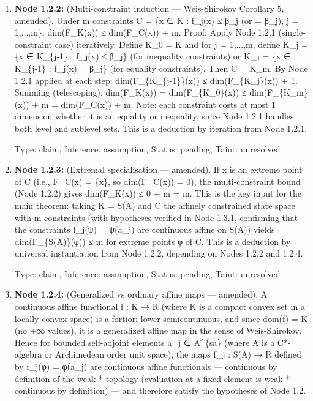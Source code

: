 \documentclass{article}
\begin{document}
\begin{enumerate}
\begin{enumerate}
  Type: claim, Inference: assumption, Status: pending, Taint: unresolved

\item \textbf{Node 1.2.2:} (Multi-constraint induction — Weis-Shirokov Corollary 5, amended). Under m constraints C = \{x ∈ K : f\_j(x) ≤ β\_j (or = β\_j), j = 1,...,m\}: dim(F\_K(x)) ≤ dim(F\_C(x)) + m. Proof: Apply Node 1.2.1 (single-constraint case) iteratively. Define K\_0 = K and for j = 1,...,m, define K\_j = \{x ∈ K\_\{j-1\} : f\_j(x) ≤ β\_j\} (for inequality constraints) or K\_j = \{x ∈ K\_\{j-1\} : f\_j(x) = β\_j\} (for equality constraints). Then C = K\_m. By Node 1.2.1 applied at each step: dim(F\_\{K\_\{j-1\}\}(x)) ≤ dim(F\_\{K\_j\}(x)) + 1. Summing (telescoping): dim(F\_K(x)) = dim(F\_\{K\_0\}(x)) ≤ dim(F\_\{K\_m\}(x)) + m = dim(F\_C(x)) + m. Note: each constraint costs at most 1 dimension whether it is an equality or inequality, since Node 1.2.1 handles both level and sublevel sets. This is a deduction by iteration from Node 1.2.1.

  Type: claim, Inference: assumption, Status: pending, Taint: unresolved

\item \textbf{Node 1.2.3:} (Extremal specialisation — amended). If x is an extreme point of C (i.e., F\_C(x) = \{x\}, so dim(F\_C(x)) = 0), the multi-constraint bound (Node 1.2.2) gives dim(F\_K(x)) ≤ 0 + m = m. This is the key input for the main theorem: taking K = S(A) and C the affinely constrained state space with m constraints (with hypotheses verified in Node 1.3.1, confirming that the constraints f\_j(ψ) = ψ(a\_j) are continuous affine on S(A)) yields dim(F\_\{S(A)\}(φ)) ≤ m for extreme points φ of C. This is a deduction by universal instantiation from Node 1.2.2, depending on Nodes 1.2.2 and 1.2.4.

  Type: claim, Inference: assumption, Status: pending, Taint: unresolved

\item \textbf{Node 1.2.4:} (Generalized vs ordinary affine maps — amended). A continuous affine functional f : K → R (where K is a compact convex set in a locally convex space) is a fortiori lower semicontinuous, and since dom(f) = K (no +∞ values), it is a generalized affine map in the sense of Weis-Shirokov. Hence for bounded self-adjoint elements a\_j ∈ A\textasciicircum{}\{sa\} (where A is a C*-algebra or Archimedean order unit space), the maps f\_j : S(A) → R defined by f\_j(φ) = φ(a\_j) are continuous affine functionals — continuous by definition of the weak-* topology (evaluation at a fixed element is weak-* continuous by definition) — and therefore satisfy the hypotheses of Node 1.2.


\end{enumerate}
\end{enumerate}
\end{document}
